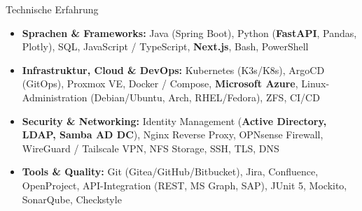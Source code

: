 \documentclass[]{mcdowellcv}
\begin{document}
    \newpage 

    \begin{cvsection}{Technische Erfahrung}
        \begin{cvsubsection}{}{}{}
            \begin{itemize}
                \item \textbf{Sprachen \& Frameworks:} Java (Spring Boot), Python (\textbf{FastAPI}, Pandas, Plotly), SQL, JavaScript / TypeScript, \textbf{Next.js}, Bash, PowerShell
                \item \textbf{Infrastruktur, Cloud \& DevOps:} Kubernetes (K3s/K8s), ArgoCD (GitOps), Proxmox VE, Docker / Compose, \textbf{Microsoft Azure}, Linux-Administration (Debian/Ubuntu, Arch, RHEL/Fedora), ZFS, CI/CD
                \item \textbf{Security \& Networking:} Identity Management (\textbf{Active Directory, LDAP, Samba AD DC}), Nginx Reverse Proxy, OPNsense Firewall, WireGuard / Tailscale VPN, NFS Storage, SSH, TLS, DNS
                \item \textbf{Tools \& Quality:} Git (Gitea/GitHub/Bitbucket), Jira, Confluence, OpenProject, API-Integration (REST, MS Graph, SAP), JUnit 5, Mockito, SonarQube, Checkstyle
            \end{itemize}
        \end{cvsubsection}
    \end{cvsection}

    \vspace{0.25cm}
\end{document}
